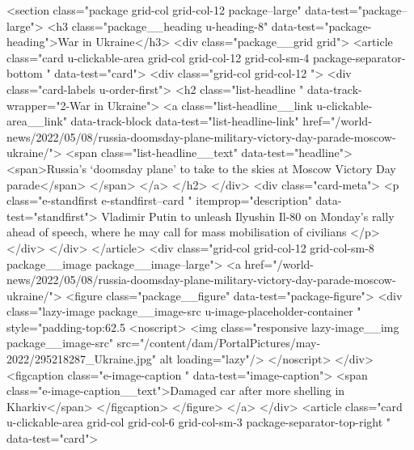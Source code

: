 {{{<section class="package grid-col grid-col-12 package--large" data-test="package--large">
<h3 class="package__heading u-heading-8" data-test="package-heading">War in Ukraine</h3>
<div class="package__grid grid">
<article class="card u-clickable-area grid-col grid-col-12 grid-col-sm-4 package-separator-bottom " data-test="card">
<div class="grid-col grid-col-12  ">
<div class="card-labels u-order-first">
<h2 class="list-headline  " data-track-wrapper="2-War in Ukraine">
<a class="list-headline__link u-clickable-area__link" data-track-block data-test="list-headline-link" href="/world-news/2022/05/08/russia-doomsday-plane-military-victory-day-parade-moscow-ukraine/">
<span class="list-headline__text" data-test="headline">
<span>Russia’s ‘doomsday plane’ to take to the skies at Moscow Victory Day parade</span>
</span>
</a>
</h2>
</div>
<div class="card-meta">
<p class="e-standfirst e-standfirst--card " itemprop="description" data-test="standfirst">
Vladimir Putin to unleash Ilyushin Il-80 on Monday’s rally ahead of speech, where he may call for mass mobilisation of civilians
</p>
</div>
</div>
</article>
<div class="grid-col grid-col-12 grid-col-sm-8 package__image package__image--large">
<a href="/world-news/2022/05/08/russia-doomsday-plane-military-victory-day-parade-moscow-ukraine/">
<figure class="package__figure" data-test="package-figure">
<div class="lazy-image package__image-src u-image-placeholder-container " style="padding-top:62.5%
<noscript>
<img class="responsive lazy-image__img package__image-src" src="/content/dam/PortalPictures/may-2022/295218287_Ukraine.jpg" alt loading="lazy"/>
</noscript>
</div>
<figcaption class="e-image-caption " data-test="image-caption">
<span class="e-image-caption__text">Damaged car after more shelling in Kharkiv</span>
</figcaption>
</figure>
</a>
</div>
<article class="card u-clickable-area grid-col grid-col-6 grid-col-sm-3 package-separator-top-right " data-test="card">
}}}
